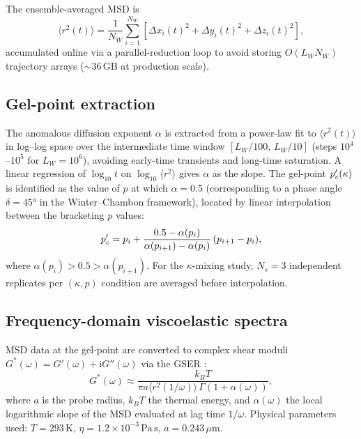 The ensemble-averaged MSD is
\begin{equation}
  \langle r^2(t) \rangle = \frac{1}{N_W} \sum_{i=1}^{N_W}
    \left[\Delta x_i(t)^2 + \Delta y_i(t)^2 + \Delta z_i(t)^2\right],
  \label{eq:msd}
\end{equation}
accumulated online via a parallel-reduction loop to avoid storing $O(L_W N_W)$ trajectory arrays ($\sim$36\,GB at production scale).

\subsection{Gel-point extraction}

The anomalous diffusion exponent $\alpha$ is extracted from a power-law fit to $\langle r^2(t)\rangle$ in log--log space over the intermediate time window $[L_W/100,\, L_W/10]$ (steps $10^4$--$10^5$ for $L_W = 10^6$), avoiding early-time transients and long-time saturation. A linear regression of $\log_{10} t$ on $\log_{10}\langle r^2 \rangle$ gives $\alpha$ as the slope. The gel-point $p_c'(\kappa)$ is identified as the value of $p$ at which $\alpha = 0.5$ (corresponding to a phase angle $\delta = 45°$ in the Winter--Chambon framework), located by linear interpolation between the bracketing $p$ values:
\begin{equation}
  p_c' = p_i + \frac{0.5 - \alpha(p_i)}{\alpha(p_{i+1}) - \alpha(p_i)}\,(p_{i+1} - p_i),
  \label{eq:interpolation}
\end{equation}
where $\alpha(p_i) > 0.5 > \alpha(p_{i+1})$. For the $\kappa$-mixing study, $N_s = 3$ independent replicates per $(\kappa, p)$ condition are averaged before interpolation.

\subsection{Frequency-domain viscoelastic spectra}

MSD data at the gel-point are converted to complex shear moduli $G^*(\omega) = G'(\omega) + \mathrm{i}G''(\omega)$ via the GSER \citep{Mason1995}:
\begin{equation}
  G^*(\omega) \approx \frac{k_B T}{\pi a \langle r^2(1/\omega) \rangle \,\Gamma(1+\alpha(\omega))},
  \label{eq:gser}
\end{equation}
where $a$ is the probe radius, $k_B T$ the thermal energy, and $\alpha(\omega)$ the local logarithmic slope of the MSD evaluated at lag time $1/\omega$. Physical parameters used: $T = 293\,\mathrm{K}$, $\eta = 1.2\times 10^{-3}\,\mathrm{Pa\,s}$, $a = 0.243\,\mu\mathrm{m}$.


